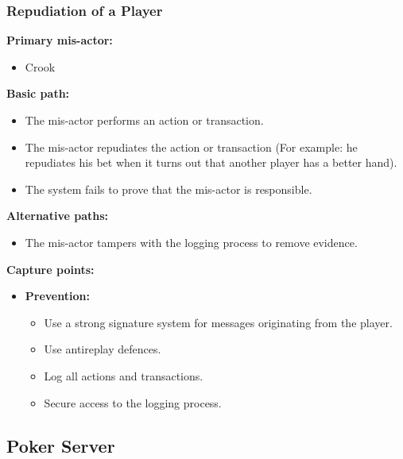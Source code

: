 \documentclass[a4paper,11pt]{report}
\begin{document}
\subsubsection{Repudiation of a Player}
\textbf{Primary mis-actor:}
\begin{itemize}
\item Crook
\end{itemize}
\textbf{Basic path:}
\begin{itemize}
\item The mis-actor performs an action or transaction.
\item The mis-actor repudiates the action or transaction (For example: he repudiates his bet when it turns out that another player has a better hand).
\item The system fails to prove that the mis-actor is responsible.
\end{itemize}
\textbf{Alternative paths:}
\begin{itemize}
\item The mis-actor tampers with the logging process to remove evidence.
\end{itemize}
\textbf{Capture points:}
\begin{itemize}
\item \textbf{Prevention:}
\begin{itemize}
\item Use a strong signature system for messages originating from the player.
\item Use antireplay defences.
\item Log all actions and transactions.
\item Secure access to the logging process.
\end{itemize}
\end{itemize}

\subsection{Poker Server}
\end{document}
